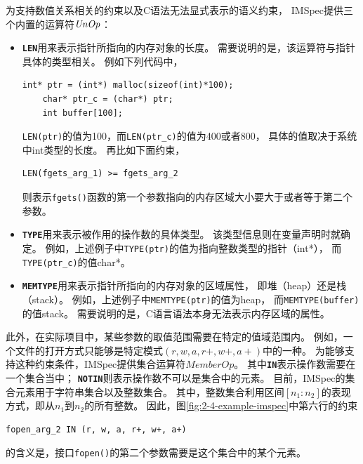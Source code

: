 为支持数值关系相关的约束以及C语法无法显式表示的语义约束，
IMSpec提供三个内置的运算符$\mathit{UnOp}$：
\begin{itemize}
	\item 
	\textbf{\texttt{LEN}}用来表示指针所指向的内存对象的长度。
	需要说明的是，该运算符与指针具体的类型相关。
	例如下列代码中，
	\begin{lstlisting}[language={[ANSI]C},
	basicstyle=\linespread{0.8}\listingsfont,
	numbers=none,
	xleftmargin=.15\textwidth]
	int* ptr = (int*) malloc(sizeof(int)*100);
	char* ptr_c = (char*) ptr;
	int buffer[100];
	\end{lstlisting}
	\texttt{LEN(ptr)}的值为100，而\texttt{LEN(ptr\_c)}的值为400或者800，
	具体的值取决于系统中int类型的长度。
	再比如下面约束，
	\begin{lstlisting}[language={[ANSI]C},
	basicstyle=\linespread{0.8}\listingsfont,
	numbers=none,
	xleftmargin=.15\textwidth]
	LEN(fgets_arg_1) >= fgets_arg_2
	\end{lstlisting}
	则表示\texttt{fgets()}函数的第一个参数指向的内存区域大小要大于或者等于第二个参数。
	\item 
	\textbf{\texttt{TYPE}}用来表示被作用的操作数的具体类型。
	该类型信息则在变量声明时就确定。
	例如，上述例子中\texttt{TYPE(ptr)}的值为指向整数类型的指针（int*），
	而\texttt{TYPE(ptr\_c)}的值char*。
	\item 
	 \textbf{\texttt{MEMTYPE}}用来表示指针所指向的内存对象的区域属性，
	即堆（heap）还是栈（stack）。
	例如，上述例子中\texttt{MEMTYPE(ptr)}的值为heap，
	而\texttt{MEMTYPE(buffer)}的值stack。
	需要说明的是，C语言语法本身无法表示内存区域的属性。
\end{itemize}

此外，在实际项目中，某些参数的取值范围需要在特定的值域范围内。
例如，一个文件的打开方式只能够是特定模式$(r, w, a, r+, w+, a+)$中的一种。
为能够支持这种约束条件，IMSpec提供集合运算符$\mathit{MemberOp}$。
其中\texttt{\textbf{IN}}表示操作数需要在一个集合当中；
\texttt{\textbf{NOTIN}}则表示操作数不可以是集合中的元素。
目前，IMSpec的集合元素用于字符串集合以及整数集合。
其中，整数集合利用区间$[n_1:n_2]$的表现方式，即从$n_1$到$n_2$的所有整数。
因此，图\ref{fig:2-4-example-imspec}中第六行的约束
\begin{lstlisting}[language={[ANSI]C},
basicstyle=\linespread{0.8}\listingsfont,
numbers=none,
xleftmargin=.3\textwidth]
fopen_arg_2 IN (r, w, a, r+, w+, a+)
\end{lstlisting}
的含义是，接口\texttt{fopen()}的第二个参数需要是这个集合中的某个元素。



